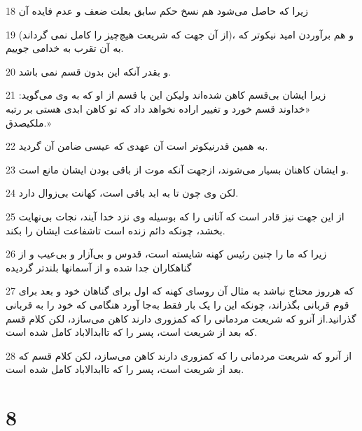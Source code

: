 \par 18 زیرا که حاصل می‌شود هم نسخ حکم سابق بعلت ضعف و عدم فایده آن
\par 19 (از آن جهت که شریعت هیچ‌چیز را کامل نمی گرداند)، و هم برآوردن امید نیکوتر که به آن تقرب به خدامی جوییم.
\par 20 و بقدر آنکه این بدون قسم نمی باشد.
\par 21 زیرا ایشان بی‌قسم کاهن شده‌اند ولیکن این با قسم از او که به وی می‌گوید: «خداوند قسم خورد و تغییر اراده نخواهد داد که تو کاهن ابدی هستی بر رتبه ملکیصدق.»
\par 22 به همین قدرنیکوتر است آن عهدی که عیسی ضامن آن گردید.
\par 23 و ایشان کاهنان بسیار می‌شوند، ازجهت آنکه موت از باقی بودن ایشان مانع است.
\par 24 لکن وی چون تا به ابد باقی است، کهانت بی‌زوال دارد.
\par 25 از این جهت نیز قادر است که آنانی را که بوسیله وی نزد خدا آیند، نجات بی‌نهایت بخشد، چونکه دائم زنده است تاشفاعت ایشان را بکند.
\par 26 زیرا که ما را چنین رئیس کهنه شایسته است، قدوس و بی‌آزار و بی‌عیب و از گناهکاران جدا شده و از آسمانها بلندتر گردیده
\par 27 که هرروز محتاج نباشد به مثال آن روسای کهنه که اول برای گناهان خود و بعد برای قوم قربانی بگذراند، چونکه این را یک بار فقط به‌جا آورد هنگامی که خود را به قربانی گذرانید.از آنرو که شریعت مردمانی را که کمزوری دارند کاهن می‌سازد، لکن کلام قسم که بعد از شریعت است، پسر را که تاابدالاباد کامل شده است.
\par 28 از آنرو که شریعت مردمانی را که کمزوری دارند کاهن می‌سازد، لکن کلام قسم که بعد از شریعت است، پسر را که تاابدالاباد کامل شده است.

\chapter{8}

